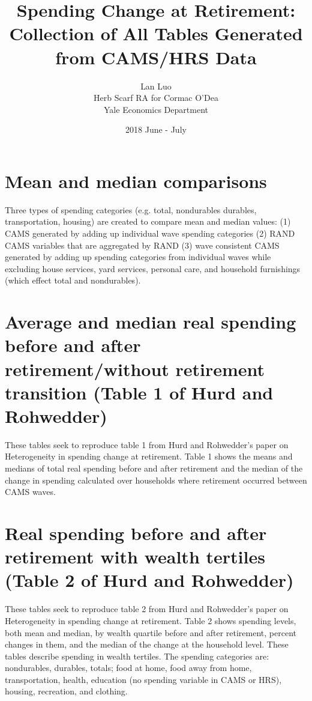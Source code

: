 \documentclass{article}
\title{\textbf{Spending Change at Retirement: Collection of All Tables Generated from CAMS/HRS Data}}
\date{2018 June - July}
\author{Lan Luo\\ Herb Scarf RA for Cormac O'Dea\\ Yale Economics Department}
\begin{document}
\maketitle
\newpage

\section{Mean and median comparisons}
Three types of spending categories (e.g. total, nondurables durables, transportation, housing) are created to compare mean and median values: (1) CAMS generated by adding up individual wave spending categories (2) RAND CAMS variables that are aggregated by RAND (3) wave consistent CAMS generated by adding up spending categories from individual waves while excluding house services, yard services, personal care, and household furnishings (which effect total and nondurables).



 
\FloatBarrier

\section{Average and median real spending before and after retirement/without retirement transition (Table 1 of Hurd and Rohwedder)} 
These tables seek to reproduce table 1 from Hurd and Rohwedder's paper on Heterogeneity in spending change at retirement. Table 1 shows the means and medians of total real spending before and after retirement and the median of the change in spending calculated over households where retirement occurred between CAMS waves.


\FloatBarrier

\section{Real spending before and after retirement with wealth tertiles (Table 2 of Hurd and Rohwedder)} 
These tables seek to reproduce table 2 from Hurd and Rohwedder's paper on Heterogeneity in spending change at retirement. Table 2 shows spending levels, both mean and median, by wealth quartile before and after retirement, percent changes in them, and the median of the change at the household level. 
\newline
These tables describe spending in wealth tertiles. The spending categories are: nondurables, durables, totals; food at home, food away from home, transportation, health, education (no spending variable in CAMS or HRS), housing, recreation, and clothing.











\FloatBarrier
\end{document}
